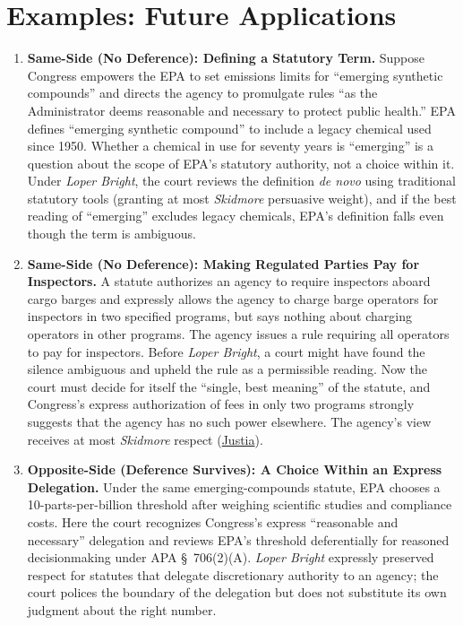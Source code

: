 \documentclass[12pt]{article}
\begin{document}
\section{Examples: Future Applications}
\begin{enumerate}

\item \textbf{Same-Side (No Deference): Defining a Statutory Term.} Suppose Congress empowers the EPA to set emissions limits for ``emerging synthetic compounds'' and directs the agency to promulgate rules ``as the Administrator deems reasonable and necessary to protect public health.'' EPA defines ``emerging synthetic compound'' to include a legacy chemical used since 1950. Whether a chemical in use for seventy years is ``emerging'' is a question about the scope of EPA's statutory authority, not a choice within it. Under \textit{Loper Bright}, the court reviews the definition \textit{de novo} using traditional statutory tools (granting at most \textit{Skidmore} persuasive weight), and if the best reading of ``emerging'' excludes legacy chemicals, EPA's definition falls even though the term is ambiguous.

\item \textbf{Same-Side (No Deference): Making Regulated Parties Pay for Inspectors.} A statute authorizes an agency to require inspectors aboard cargo barges and expressly allows the agency to charge barge operators for inspectors in two specified programs, but says nothing about charging operators in other programs. The agency issues a rule requiring all operators to pay for inspectors. Before \textit{Loper Bright}, a court might have found the silence ambiguous and upheld the rule as a permissible reading. Now the court must decide for itself the ``single, best meaning'' of the statute, and Congress's express authorization of fees in only two programs strongly suggests that the agency has no such power elsewhere. The agency's view receives at most \textit{Skidmore} respect (\href{https://supreme.justia.com/cases/federal/us/603/22-451/}{Justia}).

\item \textbf{Opposite-Side (Deference Survives): A Choice Within an Express Delegation.} Under the same emerging-compounds statute, EPA chooses a 10-parts-per-billion threshold after weighing scientific studies and compliance costs. Here the court recognizes Congress's express ``reasonable and necessary'' delegation and reviews EPA's threshold deferentially for reasoned decisionmaking under APA \S~706(2)(A). \textit{Loper Bright} expressly preserved respect for statutes that delegate discretionary authority to an agency; the court polices the boundary of the delegation but does not substitute its own judgment about the right number.


\end{enumerate}
\end{document}
